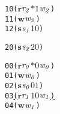\newsavebox{\boxTOne}
\begin{lrbox}{\boxTOne}
\begin{minipage}[t]{0.65\linewidth}
\large
\begin{alltt}
10 (\(\mathbf{r}\) \(\mathit{r\sb{2}}\) \(\mathit{\ast 1}\) \(\mathit{w\sb{2}}\))
11 (\(\mathbf{w}\) \(\mathit{w\sb{2}}\))
12 (\(\mathbf{s}\) \(\mathit{s\sb{1}}\) \(\mathit{1 0}\))
\end{alltt}
\end{minipage}
\end{lrbox}

\newsavebox{\boxTTwo}
\begin{lrbox}{\boxTTwo}
\begin{minipage}[t]{0.65\linewidth}
\large
\begin{alltt}
20 (\(\mathbf{s}\) \(\mathit{s\sb{2}}\) \(\mathit{2 0}\))
\end{alltt}
\end{minipage}
\end{lrbox}


\newcommand\examplefigone{
\begin{figure*}[tb]
\begin{center}
\setlength{\tabcolsep}{2pt}
\begin{tabular}[t]{c|c|c}
$\mathit{p_0}$ & $\mathit{p_1}$ & $\mathit{p_2}$ \\
\hline
\scalebox{0.8}{\usebox{\boxTZero}}&
\scalebox{0.8}{\usebox{\boxTOne}} &
\scalebox{0.8}{\usebox{\boxTTwo}}\\
\end{tabular}
\end{center}
\caption{A deadlock caused by orphaned receive.}
\label{fig:deadlock1}
\end{figure*}
}



\newsavebox{\boxnozero}
\begin{lrbox}{\boxnozero}
\begin{minipage}[t]{0.65\linewidth}
\large
\begin{alltt}	
00 (\(\mathbf{r}\) \(\mathit{r\sb{0}}\) \(\mathit{\ast 0}\) \(\mathit{w\sb{0}}\))
01 (\(\mathbf{w}\) \(\mathit{w\sb{0}}\))
02 (\(\mathbf{s}\) \(\mathit{s\sb{0}}\) \(\mathit{0 1}\)) 
03 \underline{(\(\mathbf{r}\) \(\mathit{r\sb{1}}\) \(\mathit{1 0}\) \(\mathit{w\sb{1}}\))}
04 (\(\mathbf{w}\) \(\mathit{w\sb{1}}\)) 
\end{alltt}
\end{minipage}
\end{lrbox}


